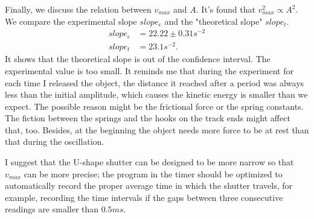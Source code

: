    Finally, we discuss the relation between $v_{max}$ and $A$. It's found that $v_{max}^2\propto A^2$. We compare the experimental slope $slope_e$ and the "theoretical slope" $slope_t$.
    \[
    \begin{split}
        slope_e&=22.22\pm0.31s^{-2}\\
        slope_t&=23.1s^{-2}.
    \end{split}
    \]
    It shows that the theoretical slope is out of the confidence interval. The experimental value is too small. It reminds me that during the experiment for each time I released the object, the distance it reached after a period was always less than the initial amplitude, which causes the kinetic energy is smaller than we expect. The possible reason might be the frictional force or the spring constants. The fiction between the springs and the hooks on the track ends might affect that, too. Besides, at the beginning the object needs more force to be at rest than that during the oscillation.
    
    I suggest that the U-shape shutter can be designed to be more narrow so that $v_{max}$ can be more precise; the program in the timer should be optimized to automatically record the proper average time in which the shutter travels, for example, recording the time intervals if the gaps between three consecutive readings are smaller than $0.5ms$.